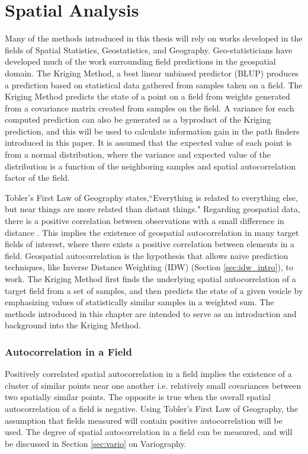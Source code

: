 \chapter{Spatial Analysis}
Many of the methods introduced in this thesis will rely on works developed in the fields of Spatial Statistics, Geostatistics, and Geography. Geo-statisticians have developed much of the work surrounding field predictions in the geospatial domain. The Kriging Method, a best linear unbiased predictor (BLUP) produces a prediction based on statistical data gathered from samples taken on a field. The Kriging Method predicts the state of a point on a field from weights generated from a covariance matrix created from samples on the field. A variance for each computed prediction can also be generated as a byproduct of the Kriging prediction, and this will be used to calculate information gain in the path finders introduced in this paper. It is assumed that the expected value of each point is from a normal distribution, where the variance and expected value of the distribution is a function of the neighboring samples and spatial autocorrelation factor of the field.

Tobler's First Law of Geography \cite{tobler:first_law} states,``Everything is related to everything else, but near things are more related than distant things." Regarding geospatial data, there is a positive correlation between observations with a small difference in distance \cite{miller:on_toblers_first_law}. This implies the existence of geospatial autocorrelation in many target fields of interest, where there exists a positive correlation between elements in a field. Geospatial autocorrelation is the hypothesis that allows naive prediction techniques, like Inverse Distance Weighting (IDW) (Section \ref{sec:idw_intro}), to work. The Kriging Method first finds the underlying spatial autocorrelation of a target field from a set of samples, and then predicts the state of a given vesicle by emphasizing values of statistically similar samples in a weighted sum. The methods introduced in this chapter are intended to serve as an introduction and background into the Kriging Method.

\subsection{Autocorrelation in a Field}
Positively correlated spatial autocorrelation in a field implies the existence of a cluster of similar points near one another i.e. relatively small covariances between two spatially similar points. The opposite is true when the overall spatial autocorrelation of a field is negative. Using Tobler's First Law of Geography, the assumption that fields measured will contain positive autocorrelation will be used. The degree of spatial autocorrelation in a field can be measured, and will be discussed in Section \ref{sec:vario} on Variography.

